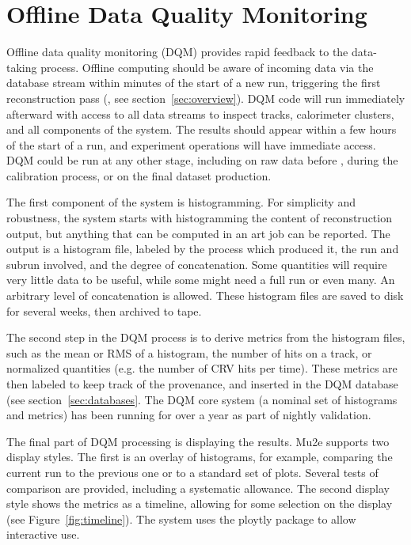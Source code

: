 \section{Offline Data Quality Monitoring}
\label{sec:monitoring}

Offline data quality monitoring (DQM) provides rapid feedback to the data-taking process. Offline computing should be aware of incoming data via the database stream within minutes of the start of a new run, triggering the first reconstruction pass (\passone, see section~\ref{sec:overview}). DQM code will run immediately afterward with access to all data streams to inspect tracks, calorimeter clusters, and all components of the system. The results should appear within a few hours of the start of a run, and experiment operations will have immediate access. DQM could be run at any other stage, including on raw data before \passone, during the calibration process, or on the final dataset production.

The first component of the system is histogramming. For simplicity and robustness, the system starts with histogramming the content of reconstruction output, but anything that can be computed in an art job can be reported. The output is a histogram file, labeled by the process which produced it, the run and subrun involved, and the degree of concatenation. Some quantities will require very little data to be useful, while some might need a full run or even many. An arbitrary level of concatenation is allowed. These histogram files are saved to disk for several weeks, then archived to tape.

The second step in the DQM process is to derive metrics from the histogram files, such as the mean or RMS of a histogram, the number of hits on a track, or normalized quantities (e.g. the number of CRV hits per time). These metrics are then labeled to keep track of the provenance, and inserted in the DQM database (see section~\ref{sec:databases}. The DQM core system (a nominal set of histograms and metrics) has been running for over a year as part of nightly validation.

The final part of DQM processing is displaying the results. Mu2e supports two display styles. The first is an overlay of histograms, for example, comparing the current run to the previous one or to a standard set of plots. Several tests of comparison are provided, including a systematic allowance. The second display style shows the metrics as a timeline, allowing for some selection on the display (see Figure~\ref{fig:timeline}). The system uses the ploytly package to allow interactive use.

